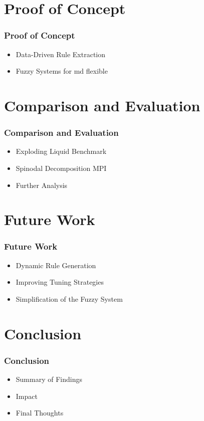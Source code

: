 \documentclass[
	10pt,
	t		%
]{beamer}
\begin{document}
\section{Proof of Concept}
\begin{frame}
	\frametitle{Proof of Concept}
	\begin{itemize}
		\item Data-Driven Rule Extraction
		\item Fuzzy Systems for md flexible
	\end{itemize}
\end{frame}

\section{Comparison and Evaluation}
\begin{frame}
	\frametitle{Comparison and Evaluation}
	\begin{itemize}
		\item Exploding Liquid Benchmark
		\item Spinodal Decomposition MPI
		\item Further Analysis
	\end{itemize}
\end{frame}

\section{Future Work}
\begin{frame}
	\frametitle{Future Work}
	\begin{itemize}
		\item Dynamic Rule Generation
		\item Improving Tuning Strategies
		\item Simplification of the Fuzzy System
	\end{itemize}
\end{frame}

\section{Conclusion}
\begin{frame}
	\frametitle{Conclusion}
	\begin{itemize}
		\item Summary of Findings
		\item Impact
		\item Final Thoughts
	\end{itemize}
\end{frame}
\end{document}
